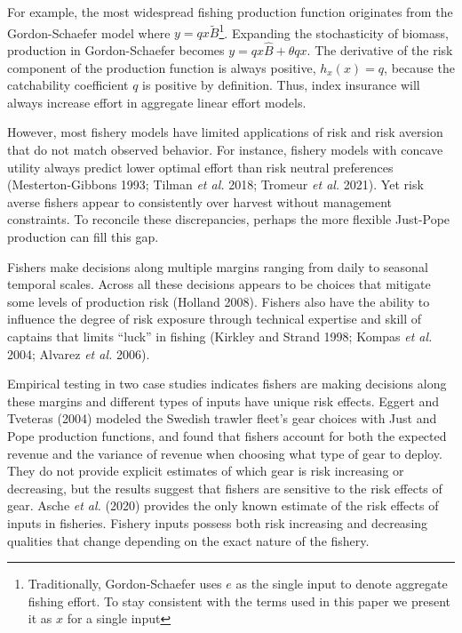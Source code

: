 \documentclass[
  letterpaper,
  DIV=11,
  numbers=noendperiod]{scrartcl}
\theoremstyle{plain}
\theoremstyle{plain}
\theoremstyle{remark}
\begin{document}
For example, the most widespread fishing production function originates
from the Gordon-Schaefer model where \(y=qx\tilde{B}\)\footnote{Traditionally,
  Gordon-Schaefer uses \(e\) as the single input to denote aggregate
  fishing effort. To stay consistent with the terms used in this paper
  we present it as \(x\) for a single input}. Expanding the
stochasticity of biomass, production in Gordon-Schaefer becomes
\(y=qx \hat{B}+\theta qx\). The derivative of the risk component of the
production function is always positive, \(h_{x}(x)=q\), because the
catchability coefficient \(q\) is positive by definition. Thus, index
insurance will always increase effort in aggregate linear effort models.

However, most fishery models have limited applications of risk and risk
aversion that do not match observed behavior. For instance, fishery
models with concave utility always predict lower optimal effort than
risk neutral preferences (Mesterton-Gibbons 1993; Tilman \emph{et al.}
2018; Tromeur \emph{et al.} 2021). Yet risk averse fishers appear to
consistently over harvest without management constraints. To reconcile
these discrepancies, perhaps the more flexible Just-Pope production can
fill this gap.

Fishers make decisions along multiple margins ranging from daily to
seasonal temporal scales. Across all these decisions appears to be
choices that mitigate some levels of production risk (Holland 2008).
Fishers also have the ability to influence the degree of risk exposure
through technical expertise and skill of captains that limits ``luck''
in fishing (Kirkley and Strand 1998; Kompas \emph{et al.} 2004; Alvarez
\emph{et al.} 2006).

Empirical testing in two case studies indicates fishers are making
decisions along these margins and different types of inputs have unique
risk effects. Eggert and Tveteras (2004) modeled the Swedish trawler
fleet's gear choices with Just and Pope production functions, and found
that fishers account for both the expected revenue and the variance of
revenue when choosing what type of gear to deploy. They do not provide
explicit estimates of which gear is risk increasing or decreasing, but
the results suggest that fishers are sensitive to the risk effects of
gear. Asche \emph{et al.} (2020) provides the only known estimate of the
risk effects of inputs in fisheries. Fishery inputs possess both risk
increasing and decreasing qualities that change depending on the exact
nature of the fishery.
\end{document}
